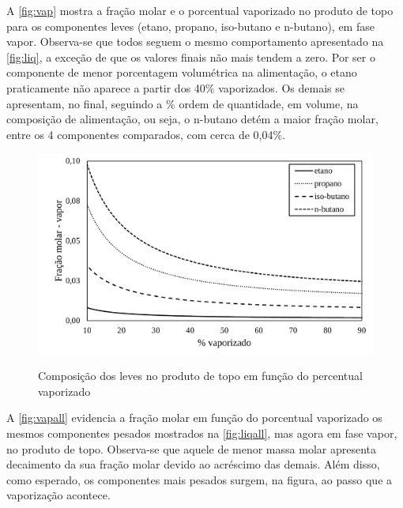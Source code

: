 A \autoref{fig:vap} mostra a fração molar e o porcentual vaporizado no produto
de topo para os componentes leves (etano, propano, iso-butano e n-butano), em fase vapor. 
Observa-se que todos seguem o mesmo comportamento apresentado na
\autoref{fig:liq}, a exceção de que os valores finais não mais tendem a zero.
Por ser o componente de menor porcentagem volumétrica na alimentação, o etano praticamente não aparece
a partir dos 40{\%} vaporizados. Os demais se apresentam, no final, seguindo a
{\%} ordem de quantidade, em volume, na composição de alimentação, ou seja, 
o n-butano detém a maior fração molar, entre os 4 componentes comparados, 
com cerca de 0,04{\%}.

\clearpage

\begin{figure}[htb]
\centering
{\includegraphics[width=1.0\textwidth]{img/trab3vap.pdf}} 
\caption{Composição dos leves no produto de topo em função do percentual
vaporizado}
\label{fig:vap}
\end{figure}

A \autoref{fig:vapall} evidencia a fração molar em função do porcentual vaporizado
os mesmos componentes pesados mostrados na \autoref{fig:liqall}, mas agora em
fase vapor, no produto de topo. Observa-se que aquele de menor massa molar
apresenta decaimento da sua fração molar devido ao acréscimo das demais. Além disso, como esperado, os 
componentes mais pesados surgem, na figura, ao passo que a vaporização
acontece.

\clearpage

